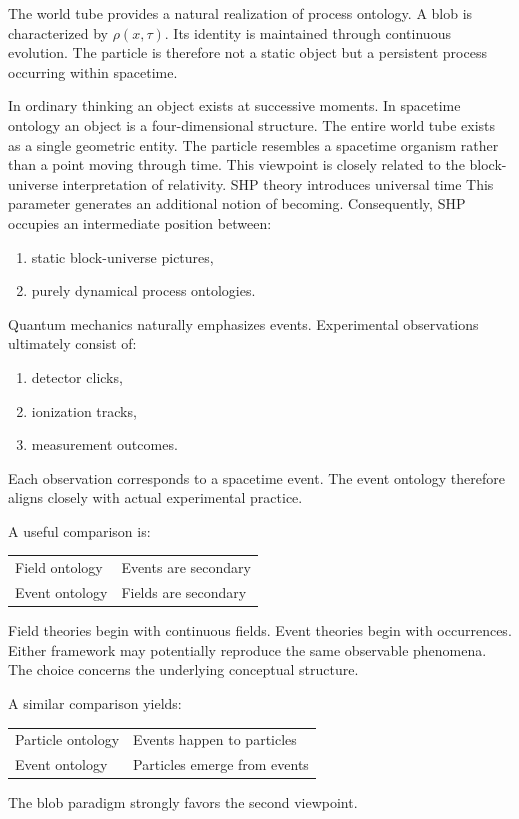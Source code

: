 The world tube provides a natural realization of process ontology.
A blob is characterized by $\rho(x,\tau).$
Its identity is maintained through continuous evolution.
The particle is therefore not a static object but a persistent process occurring within spacetime.

In ordinary thinking an object exists at successive moments.
In spacetime ontology an object is a four-dimensional structure.
The entire world tube exists as a single geometric entity.
The particle resembles a spacetime organism rather than a point moving through time.
This viewpoint is closely related to the block-universe interpretation of relativity.
SHP theory introduces universal time
This parameter generates an additional notion of becoming.
Consequently, SHP occupies an intermediate position between:
\begin{enumerate}
\item static block-universe pictures,
\item purely dynamical process ontologies.
\end{enumerate}

Quantum mechanics naturally emphasizes events.
Experimental observations ultimately consist of:
\begin{enumerate}
\item detector clicks,
\item ionization tracks,
\item measurement outcomes.
\end{enumerate}
Each observation corresponds to a spacetime event.
The event ontology therefore aligns closely with actual experimental practice.

A useful comparison is:
\begin{center}
\begin{tabular}{ll}
Field ontology & Events are secondary \\
Event ontology & Fields are secondary
\end{tabular}
\end{center}
Field theories begin with continuous fields.
Event theories begin with occurrences.
Either framework may potentially reproduce the same observable phenomena.
The choice concerns the underlying conceptual structure.

A similar comparison yields:
\begin{center}
\begin{tabular}{ll}
Particle ontology & Events happen to particles \\
Event ontology & Particles emerge from events
\end{tabular}
\end{center}
The blob paradigm strongly favors the second viewpoint.

